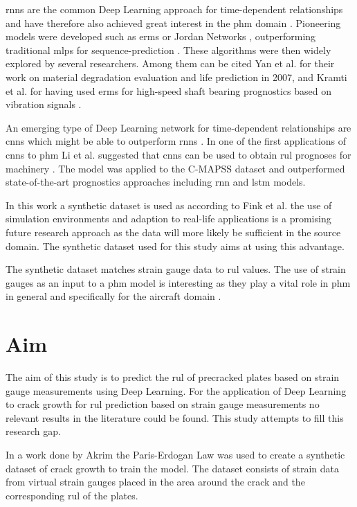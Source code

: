 \documentclass[conference]{IEEEtran}
\begin{document}
\glspl{rnn} are the common Deep Learning approach for time-dependent relationships and have therefore also achieved great interest in the \gls{phm} domain \cite{Akrim2021}. Pioneering models were developed such as \glspl{erm} \cite{Elman1990} or Jordan Networks \cite{Jordan1997}, outperforming traditional \glspl{mlp} for sequence-prediction \cite{Akrim2021}. These algorithms were then widely explored by several researchers. Among them can be cited Yan et al. \cite{Yan2007} for their work on material degradation evaluation and life prediction in 2007, and Kramti et al. \cite{Kramti2018} for having used \glspl{erm} for high-speed shaft bearing prognostics based on vibration signals \cite{Akrim2021}.

An emerging type of Deep Learning network for time-dependent relationships are \glspl{cnn} which might be able to outperform \glspl{rnn} \cite{Bai2018}. In one of the first applications of \glspl{cnn} to \gls{phm} Li et al. suggested that \glspl{cnn} can be used to obtain \gls{rul} prognoses for machinery \cite{Li2018}. The model was applied to the C-MAPSS dataset \cite{Saxena2008} and outperformed state-of-the-art prognostics approaches including \gls{rnn} and \gls{lstm} models.

In this work a synthetic dataset is used as according to Fink et al. \cite{Fink2020} the use of simulation environments and adaption to real-life applications is a promising future research approach as the data will more likely be sufficient in the source domain. The synthetic dataset used for this study aims at using this advantage.

The synthetic dataset matches strain gauge data to \gls{rul} values. The use of strain gauges as an input to a \gls{phm} model is interesting as they play a vital role in \gls{phm} in general \cite{Tinga2019} and specifically for the aircraft domain \cite{Timothy2009}.

\section{Aim}
\label{sec:aim}

The aim of this study is to predict the \gls{rul} of precracked plates based on strain gauge measurements using Deep Learning. 
For the application of Deep Learning to crack growth for \gls{rul} prediction based on strain gauge measurements no relevant results in the literature could be found. This study attempts to fill this research gap.

In a work done by Akrim \cite{Akrim} the Paris-Erdogan Law \cite{Paris1963} was used to create a synthetic dataset of crack growth to train the model. The dataset consists of strain data from virtual strain gauges placed in the area around the crack and the corresponding \gls{rul} of the plates.
\end{document}
